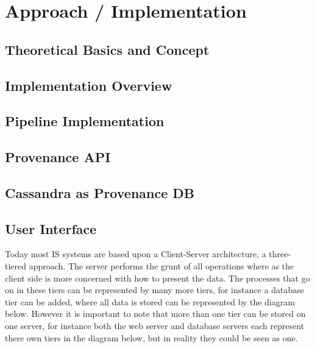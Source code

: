 \documentclass[11pt]{report}
\begin{document}
    \chapter{Approach / Implementation}




    \section{Theoretical Basics and Concept}




    \section{Implementation Overview}




    \section{Pipeline Implementation}




    \section{Provenance API}




    \section{Cassandra as Provenance DB}




    \section{User Interface}

    Today most IS systems are based upon a Client-Server architecture, a three-tiered approach. The server performs the grunt of all operations where as the client side is more concerned with how to present the data. The processes that go on in these tiers can be represented by many more tiers, for instance a database tier can be added, where all data is stored can be represented by the diagram below. However it is important to note that more than one tier can be stored on one server, for instance both the web server and database servers each represent there own tiers in the diagram below, but in reality they could be seen as one.
\end{document}
